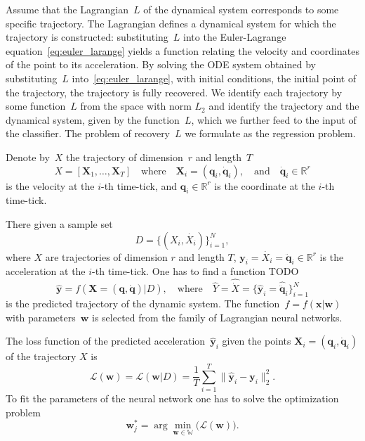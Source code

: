 \documentclass[12pt]{paper}
\begin{document}
Assume that the Lagrangian~$L$  of the dynamical system corresponds to some specific trajectory. The Lagrangian defines a dynamical system for which the trajectory is constructed: substituting~$L$ into the
Euler-Lagrange equation~\eqref{eq:euler_larange} yields a function relating the velocity and coordinates of the point to its acceleration. By solving the ODE system obtained by substituting~$L$ into~\eqref{eq:euler_larange}, with initial conditions, the initial point of the trajectory, the trajectory is fully recovered.  We identify each trajectory by some function~$L$ from the space with norm $L_2$ and identify the trajectory and the dynamical system, given by the function~$L$, which we further feed to the input of the classifier. The problem of recovery~$L$ we formulate as the regression problem.

Denote by~$X$ the trajectory of dimension~$r$ and length~$T$ 
\begin{equation}
X = [\mathbf{X}_1,\dots, \mathbf{X}_T] \quad \text{where} \quad \mathbf{X}_i = (\mathbf{q}_i, \dot{\mathbf{q}}_i), \quad  \text{and}\quad \dot{\mathbf{q}}_i \in \mathbb{R}^r
\label{definition:trajectory}
\end{equation}
is the velocity at the $i$-th time-tick, and $\mathbf{q}_i \in \mathbb{R}^r$  is the coordinate at the $i$-th time-tick.

There given a sample set 
\begin{equation}
D = \{(X_i, \dot{X_i})\}_{i=1}^N,
\label{eq:dataset}
\end{equation}
where $X$ are trajectories of dimension $r$ and length $T$, $\mathbf{y}_i = \dot{X_i} = \ddot{\mathbf{q}}_i \in \mathbb{R}^r$ is the acceleration at the $i$-th time-tick. One has to find a function TODO
\begin{equation}
\hat{\mathbf{y}}  = f(\mathbf{X} = (\mathbf{q}, \dot{\mathbf{q}}) | D),
\quad
\text{where}
\quad
\hat{Y} =\hat{\dot{X}} = \{\hat{\mathbf{y}}_i = \hat{\ddot{\mathbf{q}}}_i\}_{i=1}^N
\label{eq:model}
\end{equation}
is the predicted trajectory of the dynamic system. The function~$f=f(\mathbf{x} | \mathbf{w})$ with parameters~$\mathbf{w}$ is selected from the family  of Lagrangian neural networks.

The loss function of the predicted acceleration~$\hat{\mathbf{y}}_i$ given the points $\mathbf{X}_i = (\mathbf{q}_i, \dot{\mathbf{q}}_i)$ of the trajectory $X$ is 
\begin{equation}
 \mathcal{L}(\textbf{w}) = \mathcal{L}(\mathbf{w} | D) = \frac{1}{T}\sum_{i=1}^{T} \| \hat{\mathbf{y}}_i - \mathbf{y}_i \|_2^2.
\end{equation}
To fit the parameters of the neural network one has to solve the optimization problem
\begin{equation} 
\label{eq:opt_task}
\textbf{w}_j^* = \arg\min_{\mathbf{w} \in \mathbb{W}} \bigl( \mathcal{L}(\textbf{w}) \bigr). 
\end{equation}
\end{document}
